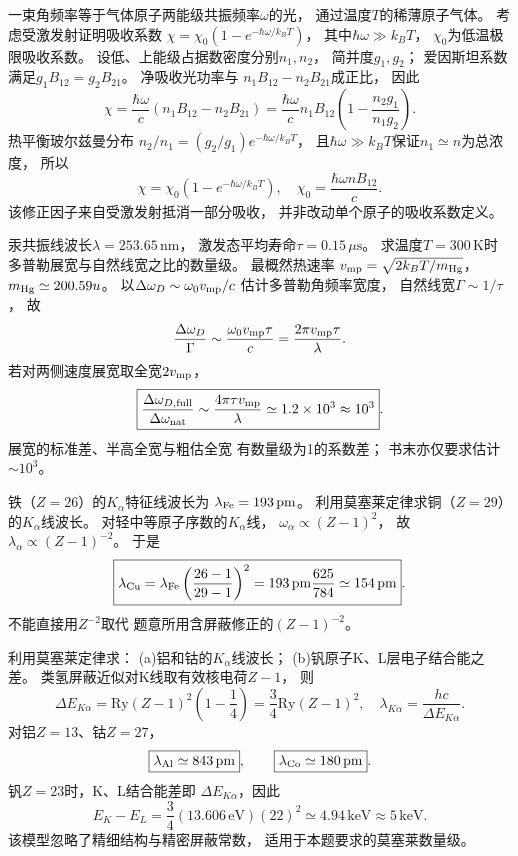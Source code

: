 一束角频率等于气体原子两能级共振频率$\omega$的光，
通过温度$T$的稀薄原子气体。
考虑受激发射证明吸收系数
$\chi=\chi_0(1-e^{-\hbar\omega/k_BT})$，
其中$\hbar\omega\gg k_BT$，
$\chi_0$为低温极限吸收系数。
\exsolution
设低、上能级占据数密度分别$n_1,n_2$，
简并度$g_1,g_2$；
爱因斯坦系数满足$g_1B_{12}=g_2B_{21}$。
净吸收光功率与
$n_1B_{12}-n_2B_{21}$成正比，
因此
\[
 \chi=\frac{\hbar\omega}{c}
 (n_1B_{12}-n_2B_{21})
 =\frac{\hbar\omega}{c}n_1B_{12}
 \left(1-\frac{n_2g_1}{n_1g_2}\right).
\]
热平衡玻尔兹曼分布
$n_2/n_1=(g_2/g_1)e^{-\hbar\omega/k_BT}$，
且$\hbar\omega\gg k_BT$保证$n_1\simeq n$为总浓度，
所以
\[
 \boxed{\chi=\chi_0(1-e^{-\hbar\omega/k_BT})},
 \quad\chi_0=\frac{\hbar\omega nB_{12}}c.
\]
\excheck 该修正因子来自受激发射抵消一部分吸收，
并非改动单个原子的吸收系数定义。

汞共振线波长$\lambda=253.65\,\mathrm{nm}$，
激发态平均寿命$\tau=0.15\,\mu\mathrm s$。
求温度$T=300\,\mathrm K$时
多普勒展宽与自然线宽之比的数量级。
\exsolution
最概然热速率
$v_{\rm mp}=\sqrt{2k_BT/m_{\rm Hg}}$，
$m_{\rm Hg}\simeq200.59u$。
以$\Delta\omega_D\sim\omega_0v_{\rm mp}/c$
估计多普勒角频率宽度，
自然线宽$\Gamma\sim1/\tau$，
故
\[
 \frac{\Delta\omega_D}{\Gamma}
 \sim\frac{\omega_0v_{\rm mp}\tau}{c}
 =\frac{2\pi v_{\rm mp}\tau}{\lambda}.
\]
若对两侧速度展宽取全宽$2v_{\rm mp}$，
\[
 \boxed{\frac{\Delta\omega_{D,\mathrm{full}}}
 {\Delta\omega_{\mathrm{nat}}}
 \sim\frac{4\pi\tau v_{\rm mp}}{\lambda}
 \simeq1.2\times10^3\approx10^3}.
\]
\excheck 展宽的标准差、半高全宽与粗估全宽
有数量级为1的系数差；
书末亦仅要求估计$\sim10^3$。

铁（$Z=26$）的$K_\alpha$特征线波长为
$\lambda_{\rm Fe}=193\,\mathrm{pm}$。
利用莫塞莱定律求铜（$Z=29$）
的$K_\alpha$线波长。
\exsolution
对轻中等原子序数的$K_\alpha$线，
$\omega_\alpha\propto(Z-1)^2$，
故$\lambda_\alpha\propto(Z-1)^{-2}$。
于是
\[
 \boxed{\lambda_{\rm Cu}=
 \lambda_{\rm Fe}\left(\frac{26-1}{29-1}\right)^2
 =193\,\mathrm{pm}\frac{625}{784}
 \simeq154\,\mathrm{pm}}.
\]
\excheck 不能直接用$Z^{-2}$取代
题意所用含屏蔽修正的$(Z-1)^{-2}$。

利用莫塞莱定律求：
(a)铝和钴的$K_\alpha$线波长；
(b)钒原子K、L层电子结合能之差。
\exsolution
类氢屏蔽近似对K线取有效核电荷$Z-1$，
则
\[
 \Delta E_{K\alpha}=
 \mathrm{Ry}(Z-1)^2\left(1-\frac14\right)
 =\frac34\mathrm{Ry}(Z-1)^2,
 \quad \lambda_{K\alpha}=\frac{hc}{\Delta E_{K\alpha}}.
\]
对铝$Z=13$、钴$Z=27$，
\[
 \boxed{\lambda_{\rm Al}\simeq843\,\mathrm{pm}},\qquad
 \boxed{\lambda_{\rm Co}\simeq180\,\mathrm{pm}}.
\]
钒$Z=23$时，K、L结合能差即
$\Delta E_{K\alpha}$，因此
\[
 \boxed{E_K-E_L=
 \frac34(13.606\,\mathrm{eV})(22)^2
 \simeq4.94\,\mathrm{keV}\approx5\,\mathrm{keV}}.
\]
\excheck 该模型忽略了精细结构与精密屏蔽常数，
适用于本题要求的莫塞莱数量级。

